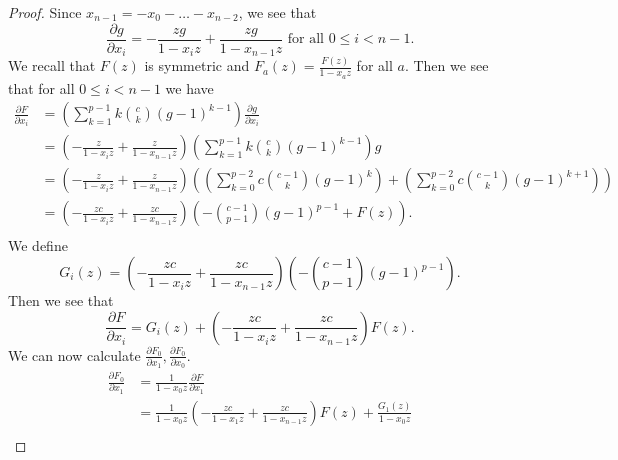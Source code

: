 \documentclass{amsart}
\numberwithin{equation}{section}
\theoremstyle{definition}
\begin{document}
\begin{proof}
Since $x_{n-1}=-x_0-\dots-x_{n-2}$, we see that
\[
\frac{\partial g}{\partial x_i}=-\frac{zg}{1-x_iz}+\frac{zg}{1-x_{n-1}z} \text{ for all $0 \le i < n-1$}.
\]
We recall that $F(z)$ is symmetric and $F_a(z)=\frac{F(z)}{1-x_az}$ for all $a$. Then we see that for all $0 \le i < n-1$ we have 
\begin{align*}
\frac{\partial F}{\partial x_i}%
&=\left(\sum_{k=1}^{p-1}k\binom{c}{k}(g-1)^{k-1}\right)\frac{\partial g}{\partial x_i}\\
&=\left(-\frac{z}{1-x_iz}+\frac{z}{1-x_{n-1}z}\right)\left(\sum_{k=1}^{p-1}k\binom{c}{k}(g-1)^{k-1}\right)g\\
&=\left(-\frac{z}{1-x_iz}+\frac{z}{1-x_{n-1}z}\right)\left(\left(\sum_{k=0}^{p-2}c\binom{c-1}{k}(g-1)^{k}\right)+\left(\sum_{k=0}^{p-2}c\binom{c-1}{k}(g-1)^{k+1}\right)\right)\\
&=\left(-\frac{zc}{1-x_iz}+\frac{zc}{1-x_{n-1}z}\right)\left(-\binom{c-1}{p-1}(g-1)^{p-1}+F(z)\right).\\
\end{align*}
We define
\[
G_i(z)=\left(-\frac{zc}{1-x_iz}+\frac{zc}{1-x_{n-1}z}\right)\left(-\binom{c-1}{p-1}(g-1)^{p-1}\right).
\]
Then we see that 
\[
\frac{\partial F}{\partial x_i}=G_i(z)+\left(-\frac{zc}{1-x_iz}+\frac{zc}{1-x_{n-1}z}\right)F(z).
\]
We can now calculate $\frac{\partial F_0}{\partial x_1},\frac{\partial F_0}{\partial x_0}$. 
\begin{align*}
\frac{\partial F_0}{\partial x_1}%
&=\frac{1}{1-x_0z}\frac{\partial F}{\partial x_1}\\
&=\frac{1}{1-x_0z}\left(-\frac{zc}{1-x_1z}+\frac{zc}{1-x_{n-1}z}\right)F(z)+\frac{G_1(z)}{1-x_0z}\\

\end{align*}
\end{proof}
\end{document}
